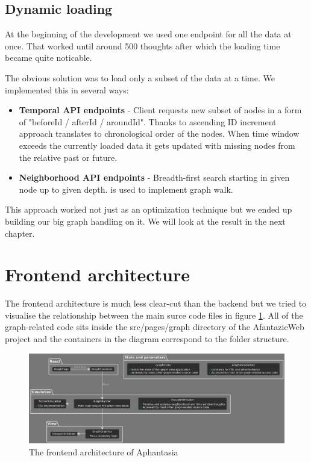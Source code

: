 \subsection*{Dynamic loading}
At the beginning of the development we used one endpoint for all the data at once.
That worked until around 500 thoughts after which the loading time became quite noticable. 

The obvious solution was to load only a subset of the data at a time. We implemented this in several ways:
\begin{itemize}
    \item \textbf{Temporal API endpoints} - Client requests new subset of nodes in a form of "beforeId / afterId / aroundId".
    Thanks to ascending ID increment approach translates to chronological order of the nodes.
    When time window exceeds the currently loaded data it gets updated with missing nodes from the relative past or future.
    \item \textbf{Neighborhood API endpoints} - Breadth-first search starting in given node up to given depth. is used to implement graph walk.
\end{itemize}

This approach worked not just as an optimization technique but we ended up building our big graph handling on it.
We will look at the result in the next chapter.

\section{Frontend architecture}

The frontend architecture is much less clear-cut than the backend
but we tried to visualise the relationship between the main surce code files in figure
\ref{obr:afantazie_frontend_architecture}.
All of the graph-related code sits inside the src/pages/graph directory of the AfantazieWeb project
and the containers in the diagram correspond to the folder structure.

\begin{figure}[p]\centering
    \includegraphics[width=140mm, keepaspectratio]{img/afantazie_frontend_architecture.png}
    \caption{The frontend architecture of Aphantasia}
    \label{obr:afantazie_frontend_architecture}
\end{figure}

